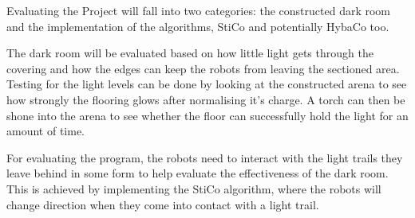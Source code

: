 Evaluating the Project will fall into two categories:  the constructed dark
room and the implementation of the algorithms, StiCo and potentially HybaCo
too.

The dark room will be evaluated based on how little light gets through the
covering and how the edges can keep the robots from leaving the sectioned area.
Testing for the light levels can be done by looking at the constructed arena to
see how strongly the flooring glows after normalising it's charge.  A torch can
then be shone into the arena to see whether the floor can successfully hold the
light for an amount of time.

\label{desBaseEval}
For evaluating the program, the robots need to interact with the light trails
they leave behind in some form to help evaluate the effectiveness of the dark 
room.  This is achieved by implementing the StiCo algorithm, where the robots
will change direction when they come into contact with a light trail.
